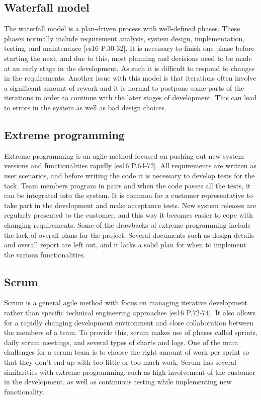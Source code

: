 \subsection{Waterfall model}
The waterfall model is a plan-driven process with well-defined phases. These phases normally include requirement analysis, system design, implementation, testing, and maintenance [es16 P.30-32]. It is necessary to finish one phase before starting the next, and due to this, most planning and decisions need to be made at an early stage in the development. As such it is difficult to respond to changes in the requirements. Another issue with this model is that iterations often involve a significant amount of rework and it is normal to postpone some parts of the iterations in order to continue with the later stages of development. This can lead to errors in the system as well as bad design choices.

\subsection{Extreme programming}
Extreme programming is an agile method focused on pushing out new system versions and functionalities rapidly [es16 P.64-72]. All requirements are written as user scenarios, and before writing the code it is necessary to develop tests for the task. Team members program  in pairs and when the code passes all the tests, it can be integrated into the system.  It is common for a customer representative to take part in the development and make acceptance tests. New system releases are regularly presented to the customer, and this way it becomes easier to cope with changing requirements. Some of the drawbacks of extreme programming include the lack of overall plans for the project. Several documents such as design details and overall report are left out, and it lacks a solid plan for when to implement the various functionalities.


\subsection{Scrum }
Scrum is a general agile method with focus on managing iterative development rather than specific technical engineering approaches [es16 P.72-74]. It also allows for a rapidly changing development environment and close collaboration between the members of a team. To provide this, scrum makes use of phases called sprints, daily scrum meetings, and several types of charts and logs. One of the main challenges for a scrum team is to choose the right amount of work per sprint so that they don’t end up with too little or too much work. Scrum has several similarities with extreme programming, such as high involvement of the customer in the development, as well as continuous testing while implementing new functionality.

